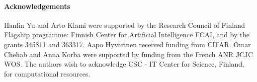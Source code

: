 
\paragraph{Acknowledgements}

Hanlin Yu and Arto Klami were supported by the Research Council of Finland Flagship programme: Finnish Center for Artificial Intelligence FCAI, and by the grants 345811 and 363317. Aapo Hyv{\"a}rinen received funding from CIFAR. Omar Chehab and Anna Korba were supported by funding from the French ANR JCJC WOS. The authors wish to acknowledge CSC - IT Center for Science, Finland, for computational resources.
